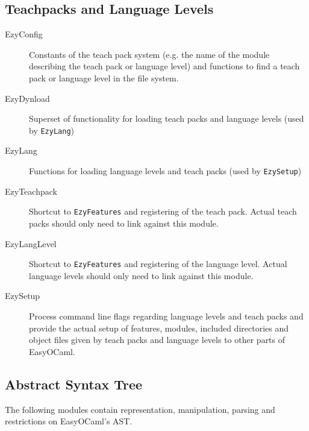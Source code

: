 \subsection{Teachpacks and Language Levels}

\begin{description}
    \item[EzyConfig] Constants of the teach pack system (e.g. the 
        name of the module describing the teach pack or language level) 
        and functions to find a teach pack or language level in the file 
        system.
    \item[EzyDynload] Superset of functionality for loading teach 
        packs and language levels (used by \texttt{EzyLang})
    \item[EzyLang] Functions for loading language levels and teach 
        packs (used by \texttt{EzySetup})
    \item[EzyTeachpack] Shortcut to \texttt{EzyFeatures} and 
        registering of the teach pack.  Actual teach packs should only 
        need to link against this module.
    \item[EzyLangLevel] Shortcut to \texttt{EzyFeatures} and 
        registering of the language level.  Actual language levels 
        should only need to link against this module.
    \item[EzySetup] Process command line flags regarding language 
        levels and teach packs and provide the actual setup of features, 
        modules, included directories and object files given by teach 
        packs and language levels to other parts of EasyOCaml.
\end{description}


\subsection{Abstract Syntax Tree}

The following modules contain representation, manipulation, parsing and 
restrictions on EasyOCaml's AST.

